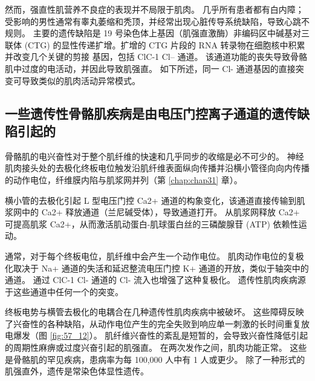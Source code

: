 然而，强直性肌营养不良症的表现并不局限于肌肉。 几乎所有患者都有白内障； 受影响的男性通常有睾丸萎缩和秃顶，并经常出现心脏传导系统缺陷，导致心跳不规则。 主要的遗传缺陷是 19 号染色体上基因（肌强直激酶）非编码区中碱基对三联体 (CTG) 的显性传递扩增。扩增的 CTG 片段的 RNA 转录物在细胞核中积累并改变几个关键的剪接 基因，包括 ClC-1 Cl– 通道。 该通道功能的丧失导致骨骼肌中过度的电活动，并因此导致肌强直。 如下所述，同一 Cl- 通道基因的直接突变可导致类似的肌肉活动异常模式。

\subsection{一些遗传性骨骼肌疾病是由电压门控离子通道的遗传缺陷引起的}

骨骼肌的电兴奋性对于整个肌纤维的快速和几乎同步的收缩是必不可少的。 神经肌肉接头处的去极化终板电位触发沿肌纤维表面纵向传播并沿横小管径向向内传播的动作电位，纤维膜内陷与肌浆网并列（第 \ref{chap:chap31} 章）。

横小管的去极化引起 L 型电压门控 Ca2+ 通道的构象变化，该通道直接传输到肌浆网中的 Ca2+ 释放通道（兰尼碱受体），导致通道打开。 从肌浆网释放 Ca2+ 可提高肌浆 Ca2+，从而激活肌动蛋白-肌球蛋白丝的三磷酸腺苷 (ATP) 依赖性运动。

通常，对于每个终板电位，肌纤维中会产生一个动作电位。 肌肉动作电位的复极化取决于 Na+ 通道的失活和延迟整流电压门控 K+ 通道的开放，类似于轴突中的通道。 通过 ClC-1 Cl- 通道的 Cl- 流入也增强了这种复极化。 遗传性肌肉疾病源于这些通道中任何一个的突变。

终板电势与横管去极化的电耦合在几种遗传性肌肉疾病中被破坏。 这些障碍反映了兴奋性的各种缺陷，从动作电位产生的完全失败到响应单一刺激的长时间重复放电爆发（图 \ref{fig:57_12}）。 肌纤维兴奋性的紊乱是短暂的，会导致兴奋性降低引起的周期性麻痹或过度兴奋引起的肌强直。 在两次发作之间，肌肉功能正常。 这些是骨骼肌的罕见疾病，患病率为每 100,000 人中有 1 人或更少。 除了一种形式的肌强直外，遗传是常染色体显性遗传。

